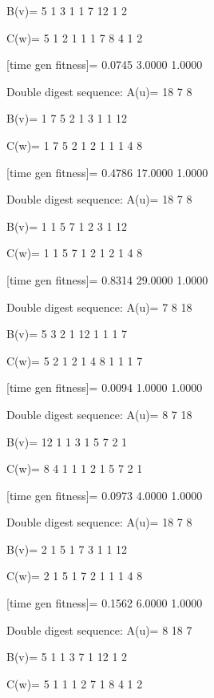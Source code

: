 B(v)=
     5     1     3     1     1     7    12     1     2

C(w)=
     5     1     2     1     1     1     7     8     4     1     2

[time gen fitness]=
    0.0745    3.0000    1.0000

Double digest sequence:
A(u)=
    18     7     8

B(v)=
     1     7     5     2     1     3     1     1    12

C(w)=
     1     7     5     2     1     2     1     1     1     4     8

[time gen fitness]=
    0.4786   17.0000    1.0000

Double digest sequence:
A(u)=
    18     7     8

B(v)=
     1     1     5     7     1     2     3     1    12

C(w)=
     1     1     5     7     1     2     1     2     1     4     8

[time gen fitness]=
    0.8314   29.0000    1.0000

Double digest sequence:
A(u)=
     7     8    18

B(v)=
     5     3     2     1    12     1     1     1     7

C(w)=
     5     2     1     2     1     4     8     1     1     1     7

[time gen fitness]=
    0.0094    1.0000    1.0000

Double digest sequence:
A(u)=
     8     7    18

B(v)=
    12     1     1     3     1     5     7     2     1

C(w)=
     8     4     1     1     1     2     1     5     7     2     1

[time gen fitness]=
    0.0973    4.0000    1.0000

Double digest sequence:
A(u)=
    18     7     8

B(v)=
     2     1     5     1     7     3     1     1    12

C(w)=
     2     1     5     1     7     2     1     1     1     4     8

[time gen fitness]=
    0.1562    6.0000    1.0000

Double digest sequence:
A(u)=
     8    18     7

B(v)=
     5     1     1     3     7     1    12     1     2

C(w)=
     5     1     1     1     2     7     1     8     4     1     2

